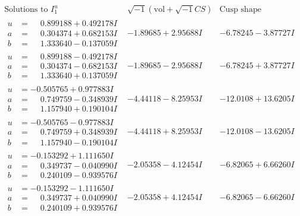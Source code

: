 \documentclass[1p]{elsarticle_modified}
\theoremstyle{definition}
\newcommand{\I}{\sqrt{-1}}
\begin{document}
$$\begin{array}{c|c|c}  
\text{Solutions to }I^u_{1}& \I (\text{vol} + \sqrt{-1}CS) & \text{Cusp shape}\\
 \hline 
\begin{aligned}
u &= \phantom{-}0.899188 + 0.492178 I \\
a &= \phantom{-}0.304374 + 0.682153 I \\
b &= \phantom{-}1.333640 - 0.137059 I\end{aligned}
 & -1.89685 + 2.95688 I & -6.78245 - 3.87727 I \\ \hline\begin{aligned}
u &= \phantom{-}0.899188 - 0.492178 I \\
a &= \phantom{-}0.304374 - 0.682153 I \\
b &= \phantom{-}1.333640 + 0.137059 I\end{aligned}
 & -1.89685 - 2.95688 I & -6.78245 + 3.87727 I \\ \hline\begin{aligned}
u &= -0.505765 + 0.977883 I \\
a &= \phantom{-}0.749759 - 0.348939 I \\
b &= \phantom{-}1.157940 + 0.190104 I\end{aligned}
 & -4.44118 - 8.25953 I & -12.0108 + 13.6205 I \\ \hline\begin{aligned}
u &= -0.505765 - 0.977883 I \\
a &= \phantom{-}0.749759 + 0.348939 I \\
b &= \phantom{-}1.157940 - 0.190104 I\end{aligned}
 & -4.44118 + 8.25953 I & -12.0108 - 13.6205 I \\ \hline\begin{aligned}
u &= -0.153292 + 1.111650 I \\
a &= \phantom{-}0.349737 - 0.040990 I \\
b &= \phantom{-}0.240109 - 0.939576 I\end{aligned}
 & -2.05358 - 4.12454 I & -6.82065 + 6.66260 I \\ \hline\begin{aligned}
u &= -0.153292 - 1.111650 I \\
a &= \phantom{-}0.349737 + 0.040990 I \\
b &= \phantom{-}0.240109 + 0.939576 I\end{aligned}
 & -2.05358 + 4.12454 I & -6.82065 - 6.66260 I \\ \hline\begin{aligned}

\end{aligned}
\end{array}$$
\end{document}
